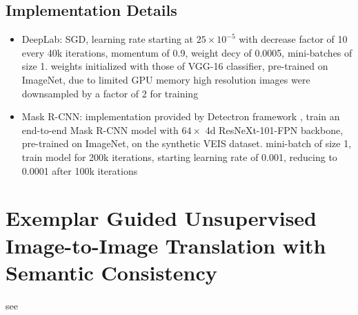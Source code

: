 \subsection{Implementation Details}
\begin{itemize}
	\item DeepLab: SGD, learning rate starting at $25 \times 10^{-5}$ with decrease factor of 10 every 40k iterations, momentum of 0.9, weight decy of 0.0005, mini-batches of size 1. weights initialized with those of VGG-16 classifier, pre-trained on ImageNet, due to limited GPU memory high resolution images were downsampled by a factor of 2 for training
	\item Mask R-CNN: implementation provided by Detectron framework , train an end-to-end Mask R-CNN model with $64 \times $ 4d ResNeXt-101-FPN backbone, pre-trained on ImageNet, on the synthetic VEIS dataset. mini-batch of size 1, train model for 200k iterations, starting learning rate of 0.001, reducing to 0.0001 after 100k iterations
\end{itemize}


\section{Exemplar Guided Unsupervised Image-to-Image Translation with Semantic Consistency}

see \cite{DBLP:journals/corr/abs-1805-11145}

